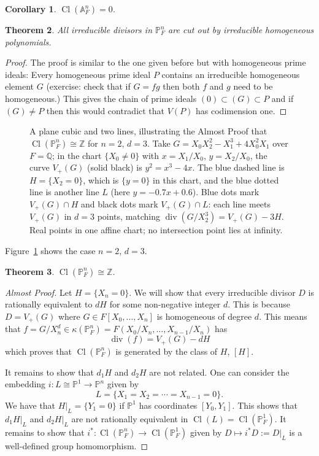 \documentclass[12pt]{article}
\numberwithin{equation}{section}
\newtheorem{theorem}{Theorem}[subsection]
\newtheorem{corollary}[theorem]{Corollary}
\theoremstyle{definition}
\theoremstyle{remark}
\newcommand{\QQ}{\mathbb{Q}}
\newcommand{\ZZ}{\mathbb{Z}}
\newcommand{\PP}{\mathbb{P}}
\renewcommand{\AA}{\mathbb{A}}
\renewcommand{\div}{\operatorname{div}}
\newcommand{\Cl}{\operatorname{Cl}}
\begin{document}
\begin{corollary}
	$\Cl(\AA^n_F)=0$.
\end{corollary}

\begin{theorem}
	All irreducible divisors in $\PP^n_F$ are cut out by irreducible homogeneous polynomials. 
\end{theorem}
\begin{proof}
	The proof is similar to the one given before but with homogeneous prime ideals:
	Every homogeneous prime ideal $P$ contains an irreducible homogeneous element $G$ (exercise: check that if $G=fg$ then both $f$ and $g$ need to be homogeneous.)
	This gives the chain of prime ideals $(0) \subset (G) \subset P$ and if $(G)\neq P$ then this would contradict that $V(P)$ has codimension one. 
\end{proof}

\begin{figure}[H]
\centering

\caption{A plane cubic and two lines, illustrating the Almost Proof that $\Cl(\PP^n_F)\cong\ZZ$ for $n=2$, $d=3$. Take $G=X_0X_2^2-X_1^3+4X_0^2X_1$ over $F=\QQ$; in the chart $\{X_0\neq0\}$ with $x=X_1/X_0$, $y=X_2/X_0$, the curve $V_+(G)$ (solid black) is $y^2=x^3-4x$. The blue dashed line is $H=\{X_2=0\}$, which is $\{y=0\}$ in this chart, and the blue dotted line is another line $L$ (here $y=-0.7x+0.6$). Blue dots mark $V_+(G)\cap H$ and black dots mark $V_+(G)\cap L$: each line meets $V_+(G)$ in $d=3$ points, matching $\div(G/X_2^3)=V_+(G)-3H$. Real points in one affine chart; no intersection point lies at infinity.}\label{fig:plane-curve-sim-dH}
\end{figure}
Figure~\ref{fig:plane-curve-sim-dH} shows the case $n=2$, $d=3$.

\begin{theorem}
	$\Cl(\PP^n_F)\cong \ZZ$.
\end{theorem}
\begin{proof}[Almost Proof]
	Let $H = \lbrace X_n = 0 \rbrace$.
	We will show that every irreducible divisor $D$ is rationally equivalent to $dH$ for some non-negative integer $d$. 
	This is because $D = V_+(G)$ where $G\in F[X_0,\ldots,X_n]$ is homogeneous of degree $d$. 
	This means that $f = G/X_n^d \in \kappa(\PP^n_F) = F(X_0/X_n,\ldots,X_{n-1}/X_n)$ has 
	$$ \div(f) = V_+(G) - d H $$
	which proves that $\Cl(\PP^n_F)$ is generated by the class of $H$, $[H]$.
	
	It remains to show that $d_1H$ and $d_2 H$ are not related.
	One can consider the embedding $i:L\cong \PP^1 \to \PP^n$ given by 
	 $$L  = \lbrace X_1=X_2=\cdots = X_{n-1}=0 \rbrace. $$
	We have that $H\vert_{L} = \lbrace Y_1 =0 \rbrace$ if $\PP^1$ has coordinates $[Y_0,Y_1]$. 
	This shows that $d_1 H\vert_L$ and $d_2 H\vert_L$ are not rationally equivalent in $\Cl(L)= \Cl(\PP^1_F)$.
	It remains to show that $i^*: \Cl(\PP^n_F) \to \Cl(\PP^1_F)$ given by $D \mapsto i^*D:=D\vert_L$ is a well-defined group homomorphism.
\end{proof}
\end{document}
